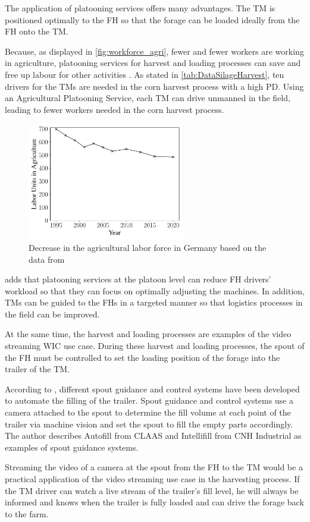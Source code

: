 The application of platooning services offers many advantages.
The \ac{TM} is positioned optimally to the \ac{FH} so that the forage can be loaded ideally from the \ac{FH} onto the \ac{TM}.

Because, as displayed in \autoref{fig:workforce_agri}, fewer and fewer workers are working in agriculture, platooning services for harvest and loading processes can save and free up labour for other activities \cite{liu_automation_2022}. As stated in \autoref{tab:DataSilageHarvest}, ten drivers for the \acp{TM} are needed in the corn harvest process with a high \ac{PD}. Using an Agricultural Platooning Service, each \ac{TM} can drive unmanned in the field, leading to fewer workers needed in the corn harvest process.

\begin{figure}[H]
   \centering
   \includegraphics[width=0.61\textwidth]{Latex/figures/WorkForceAgriculture.pdf}
   \caption{Decrease in the agricultural labor force in Germany based on the data from \cite{bmel2020}}%
   \label{fig:workforce_agri}%
\end{figure}

\textcite{smolnik_5g_2020} adds that platooning services at the platoon level can reduce \ac{FH} drivers' workload so that they can focus on optimally adjusting the machines.
In addition, \acp{TM} can be guided to the \acp{FH} in a targeted manner so that logistics processes in the field can be improved.

At the same time, the harvest and loading processes are examples of the video streaming \ac{WIC} use case.
During these harvest and loading processes, the spout of the \ac{FH} must be controlled to set the loading position of the forage into the trailer of the \ac{TM}.

According to \textcite{murcia_quadrotor_2014}, different spout guidance and control systems have been developed
to automate the filling of the trailer.
Spout guidance and control systems use a camera attached to the spout to determine the fill volume at each point of the
trailer via machine vision and set the spout to fill the empty parts accordingly.
The author describes Autofill from CLAAS and Intellifill from CNH Industrial as examples of
spout guidance systems.

Streaming the video of a camera at the spout from the \ac{FH} to the \ac{TM} would be a practical application of the video streaming use case in the harvesting process. If the \ac{TM} driver can watch a live stream of the trailer's fill level, he will always be
informed and knows when the trailer is fully loaded and can drive the forage back to the
farm.

